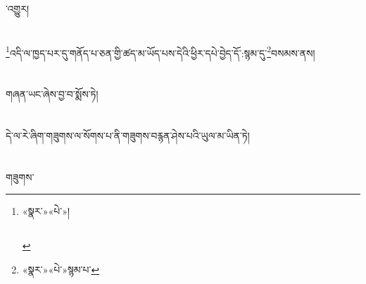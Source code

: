 ་འགྱུར།\chapter{ }\footnote{«སྣར་»«པེ་»།\chapter{ }\chapter{ }}འདི་ལ་ཁྱད་པར་དུ་གནོད་པ་ཅན་གྱི་ཚད་མ་ཡོད་པས་དེའི་ཕྱིར་དཔེ་བྱེད་དོ་:སྙམ་དུ་\footnote{«སྣར་»«པེ་»སྙམ་པ་}བསམས་ནས།\chapter{ }གཞན་ཡང་ཞེས་བྱ་བ་སྨོས་ཏེ།\chapter{ }དེ་ལ་རེ་ཞིག་གཟུགས་ལ་སོགས་པ་ནི་གཟུགས་བརྙན་ཤེས་པའི་ཡུལ་མ་ཡིན་ཏེ།\chapter{ }གཟུགས་